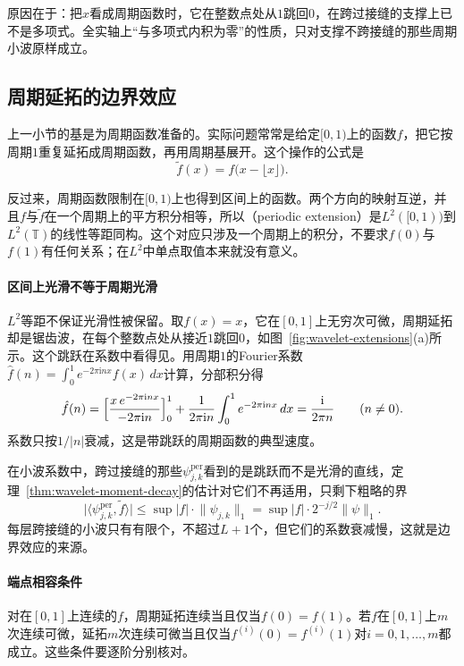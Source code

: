 原因在于：把$x$看成周期函数时，它在整数点处从$1$跳回$0$，在跨过接缝的支撑上已不是多项式。全实轴上“与多项式内积为零”的性质，只对支撑不跨接缝的那些周期小波原样成立。

\subsection{周期延拓的边界效应}
\label{sec:wavelet-periodic-extension}

上一小节的基是为周期函数准备的。实际问题常常是给定$[0,1)$上的函数$f$，把它按周期$1$重复延拓成周期函数，再用周期基展开。这个操作的公式是
\begin{equation}
 \tilde f(x)=f\bigl(x-\lfloor x\rfloor\bigr).
 \label{eq:wavelet-periodic-extension}
\end{equation}

反过来，周期函数限制在$[0,1)$上也得到区间上的函数。两个方向的映射互逆，并且$f$与$\tilde f$在一个周期上的平方积分相等，所以（periodic extension）是$L^2([0,1))$到$L^2(\mathbb T)$的线性等距同构。这个对应只涉及一个周期上的积分，不要求$f(0)$与$f(1)$有任何关系；在$L^2$中单点取值本来就没有意义。

\paragraph{区间上光滑不等于周期光滑}
$L^2$等距不保证光滑性被保留。取$f(x)=x$，它在$[0,1]$上无穷次可微，周期延拓却是锯齿波，在每个整数点处从接近$1$跳回$0$，如图~\ref{fig:wavelet-extensions}(a)所示。这个跳跃在系数中看得见。用周期$1$的Fourier系数$\hat f(n)=\int_0^1e^{-2\pi\mathrm inx}f(x)\,dx$计算，分部积分得
\[
 \hat f(n)=\Bigl[\frac{x\,e^{-2\pi\mathrm inx}}{-2\pi\mathrm in}\Bigr]_0^1+\frac{1}{2\pi\mathrm in}\int_0^1e^{-2\pi\mathrm inx}\,dx=\frac{\mathrm i}{2\pi n}\qquad(n\neq0).
\]
系数只按$1/\lvert n\rvert$衰减，这是带跳跃的周期函数的典型速度。

在小波系数中，跨过接缝的那些$\psi^{\mathrm{per}}_{j,k}$看到的是跳跃而不是光滑的直线，定理~\ref{thm:wavelet-moment-decay}的估计对它们不再适用，只剩下粗略的界
\[
 \lvert\langle\psi^{\mathrm{per}}_{j,k},\tilde f\rangle\rvert
 \leq\sup\lvert f\rvert\cdot\lVert\psi_{j,k}\rVert_1
 =\sup\lvert f\rvert\cdot2^{-j/2}\lVert\psi\rVert_1.
\]
每层跨接缝的小波只有有限个，不超过$L+1$个，但它们的系数衰减慢，这就是边界效应的来源。

\paragraph{端点相容条件}
对在$[0,1]$上连续的$f$，周期延拓连续当且仅当$f(0)=f(1)$。若$f$在$[0,1]$上$m$次连续可微，延拓$m$次连续可微当且仅当$f^{(i)}(0)=f^{(i)}(1)$对$i=0,1,\ldots,m$都成立。这些条件要逐阶分别核对。

